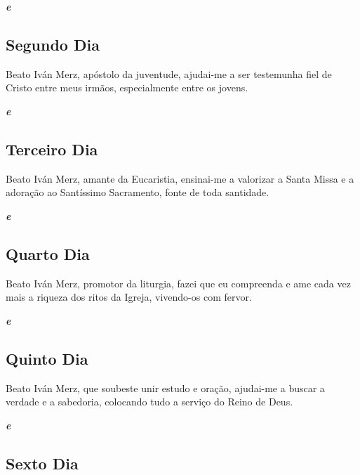 \documentclass[18pt]{article}
\begin{document}
\textbf{\textit{ e }}

\subsection*{Segundo Dia}
\textbf{\textit{}}

Beato Iván Merz, apóstolo da juventude, ajudai-me a ser testemunha fiel de Cristo entre meus irmãos, especialmente entre os jovens.

\textbf{\textit{ e }}

\subsection*{Terceiro Dia}
\textbf{\textit{}}

Beato Iván Merz, amante da Eucaristia, ensinai-me a valorizar a Santa Missa e a adoração ao Santíssimo Sacramento, fonte de toda santidade.

\textbf{\textit{ e }}

\subsection*{Quarto Dia}
\textbf{\textit{}}

Beato Iván Merz, promotor da liturgia, fazei que eu compreenda e ame cada vez mais a riqueza dos ritos da Igreja, vivendo-os com fervor.

\textbf{\textit{ e }}

\subsection*{Quinto Dia}
\textbf{\textit{}}

Beato Iván Merz, que soubeste unir estudo e oração, ajudai-me a buscar a verdade e a sabedoria, colocando tudo a serviço do Reino de Deus.

\textbf{\textit{ e }}

\subsection*{Sexto Dia}
\textbf{\textit{}}
\end{document}
